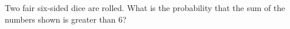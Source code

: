 Two fair six-sided dice are rolled. What is the probability that the sum of the numbers shown is greater than $6$?
